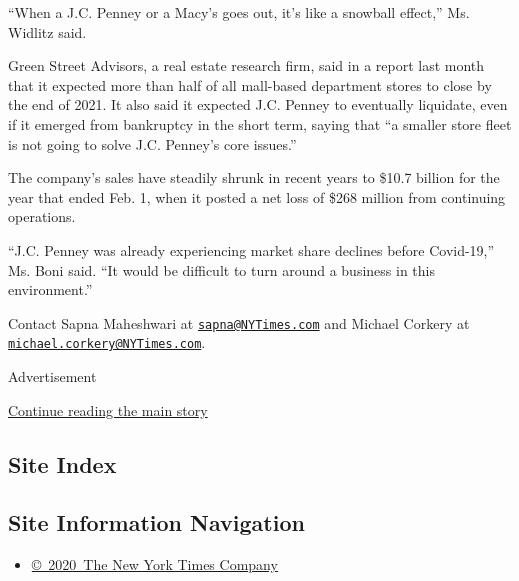 ``When a J.C. Penney or a Macy's goes out, it's like a snowball
effect,'' Ms. Widlitz said.

Green Street Advisors, a real estate research firm, said in a report
last month that it expected more than half of all mall-based department
stores to close by the end of 2021. It also said it expected J.C. Penney
to eventually liquidate, even if it emerged from bankruptcy in the short
term, saying that ``a smaller store fleet is not going to solve J.C.
Penney's core issues.''

The company's sales have steadily shrunk in recent years to \$10.7
billion for the year that ended Feb. 1, when it posted a net loss of
\$268 million from continuing operations.

``J.C. Penney was already experiencing market share declines before
Covid-19,'' Ms. Boni said. ``It would be difficult to turn around a
business in this environment.''

Contact Sapna Maheshwari at
\href{mailto:sapna@NYTimes.com}{\nolinkurl{sapna@NYTimes.com}} and
Michael Corkery at
\href{mailto:michael.corkery@NYTimes.com}{\nolinkurl{michael.corkery@NYTimes.com}}.

Advertisement

\protect\hyperlink{after-bottom}{Continue reading the main story}

\hypertarget{site-index}{%
\subsection{Site Index}\label{site-index}}

\hypertarget{site-information-navigation}{%
\subsection{Site Information
Navigation}\label{site-information-navigation}}

\begin{itemize}
\tightlist
\item
  \href{https://help.nytimes3xbfgragh.onion/hc/en-us/articles/115014792127-Copyright-notice}{©~2020~The
  New York Times Company}
\end{itemize}


